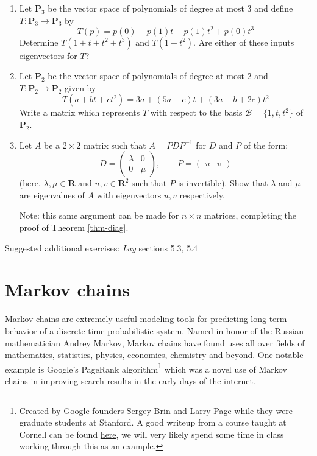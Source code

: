 \documentclass[12pt]{article}
\numberwithin{equation}{subsection}
\numberwithin{figure}{subsection}
\theoremstyle{note}
\newcommand{\R}{\mathbf{R}}
\begin{document}
\begin{enumerate}[label=\arabic*.]
	\item Let $\mathbf{P}_3$ be the vector space of polynomials of degree at most $3$ and define $T\colon \mathbf{P}_3\to \mathbf{P}_3$ by \[ T(p)=p(0)-p(1)t-p(1)t^2+p(0)t^3\]  Determine $T(1+t+t^2+t^3)$ and $T(1+t^2)$. Are either of these inputs eigenvectors for $T$?
	
	\item Let $\mathbf{P}_2$ be the vector space of polynomials of degree at most $2$ and $T\colon \mathbf{P}_2\to\mathbf{P}_2$ given by \[ T(a+bt+ct^2)=3a+(5a-c)t+(3a-b+2c)t^2\]
	Write a matrix which represents $T$ with respect to the basis $\mathcal{B}=\{1,t,t^2\}$ of $\mathbf{P}_2$. 
	
	\item \label{ex-diag} Let $A$ be a $2\times 2$ matrix such that $A=PDP^{-1}$ for $D$ and $P$ of the form: \[ D=\begin{pmatrix} \lambda & 0 \\ 0 & \mu \end{pmatrix}, \qquad P=\begin{pmatrix} u & v \end{pmatrix}\] (here, $\lambda,\mu\in\R$ and $u,v\in \R^2$ such that  $P$ is invertible). Show that $\lambda$ and $\mu$ are eigenvalues of $A$ with eigenvectors $u,v$ respectively. 
	
	Note: this same argument can be made for $n\times n$ matrices, completing the proof of Theorem \ref{thm-diag}.
\end{enumerate}


Suggested additional exercises: \textit{Lay} sections 5.3, 5.4





\section{Markov chains}

Markov chains are extremely useful modeling tools for predicting long term behavior of a discrete time probabilistic system. Named in honor of the Russian mathematician Andrey Markov, Markov chains have found uses all over fields of mathematics, statistics, physics, economics, chemistry and beyond. One notable example is Google's PageRank algorithm\footnote{Created by Google founders Sergey Brin and Larry Page while they were graduate students at Stanford. A good writeup from a course taught at Cornell can be found \href{https://pi.math.cornell.edu/~mec/Winter2009/RalucaRemus/Lecture3/lecture3.html}{here}, we will very likely spend some time in class working through this as an example.} which was a novel use of Markov chains in improving search results in the early days of the internet. 
\end{document}
